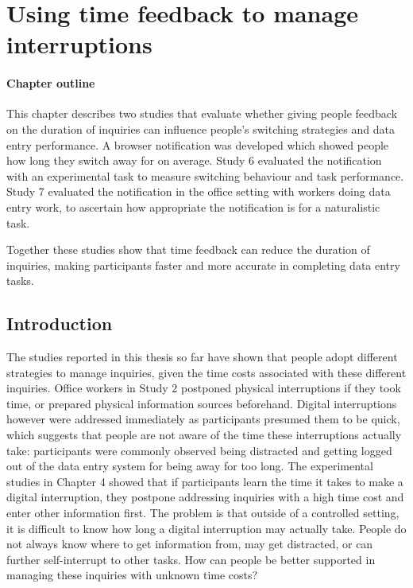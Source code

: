 \chapter{Using time feedback to manage interruptions}\label{ch:56}
\begin{mynote}
\subsubsection{Chapter outline}
This chapter describes two studies that evaluate whether giving people feedback on the duration of inquiries can influence people's switching strategies and data entry performance. A browser notification was developed which showed people how long they switch away for on average. Study 6 evaluated the notification with an experimental task to measure switching behaviour and task performance. Study 7 evaluated the notification in the office setting with workers doing data entry work, to ascertain how appropriate the notification is for a naturalistic task.

Together these studies show that time feedback can reduce the duration of inquiries, making participants faster and more accurate in completing data entry tasks.  
\end{mynote}

\section{Introduction}
The studies reported in this thesis so far have shown that people adopt different strategies to manage inquiries, given the time costs associated with these different inquiries. Office workers in Study 2 postponed physical interruptions if they took time, or prepared physical information sources beforehand. Digital interruptions however were addressed immediately as participants presumed them to be quick, which suggests that people are not aware of the time these interruptions actually take: participants were commonly observed being distracted and getting logged out of the data entry system for being away for too long. The experimental studies in Chapter 4 showed that if participants learn the time it takes to make a digital interruption, they postpone addressing inquiries with a high time cost and enter other information first. The problem is that outside of a controlled setting, it is difficult to know how long a digital interruption may actually take. People do not always know where to get information from, may get distracted, or can further self-interrupt to other tasks. How can people be better supported in managing these inquiries with unknown time costs?


